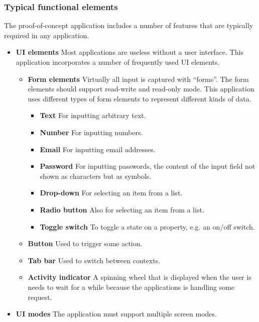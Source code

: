 \subsubsection{Typical functional elements}

The proof-of-concept application includes a number of features that are typically required in any application.

\begin{itemize}
    \item \textbf{UI elements} Most applications are useless without a user interface. This application incorporates a number of frequently used UI elements.
    \begin{itemize}
        \item \textbf{Form elements} Virtually all input is captured with ``forms''. The form elements should support read-write and read-only mode. This application uses different types of form elements to represent different kinds of data. 
        \begin{itemize}
            \item \textbf{Text} For inputting arbitrary text.
            \item \textbf{Number} For inputting numbers.
            \item \textbf{Email} For inputting email addresses.
            \item \textbf{Password} For inputting passwords, the content of the input field not shown as characters but as symbols. 
            \item \textbf{Drop-down} For selecting an item from a list.
            \item \textbf{Radio button} Also for selecting an item from a list.
            \item \textbf{Toggle switch} To toggle a state on a property, e.g. an on/off switch.
        \end{itemize}
        \item \textbf{Button} Used to trigger some action.
        \item \textbf{Tab bar} Used to switch between contexts.
        \item \textbf{Activity indicator} A spinning wheel that is displayed when the user is needs to wait for a while because the applications is handling some request.
    \end{itemize}
    \item \textbf{UI modes} The application must support multiple screen modes.
    \begin{itemize}

\end{itemize}
\end{itemize}
